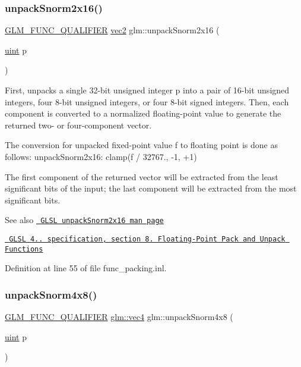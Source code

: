 \subsubsection{\texorpdfstring{unpackSnorm2x16()}{unpackSnorm2x16()}}
{\footnotesize\ttfamily \mbox{\hyperlink{setup_8hpp_a33fdea6f91c5f834105f7415e2a64407}{G\+L\+M\+\_\+\+F\+U\+N\+C\+\_\+\+Q\+U\+A\+L\+I\+F\+I\+ER}} \mbox{\hyperlink{group__core__types_gaa1618f51db67eaa145db101d8c8431d8}{vec2}} glm\+::unpack\+Snorm2x16 (\begin{DoxyParamCaption}\item[{\mbox{\hyperlink{group__core__precision_ga4fd29415871152bfb5abd588334147c8}{uint}}}]{p }\end{DoxyParamCaption})}

First, unpacks a single 32-\/bit unsigned integer p into a pair of 16-\/bit unsigned integers, four 8-\/bit unsigned integers, or four 8-\/bit signed integers. Then, each component is converted to a normalized floating-\/point value to generate the returned two-\/ or four-\/component vector.

The conversion for unpacked fixed-\/point value f to floating point is done as follows\+: unpack\+Snorm2x16\+: clamp(f / 32767., -\/1, +1)

The first component of the returned vector will be extracted from the least significant bits of the input; the last component will be extracted from the most significant bits.

\begin{DoxySeeAlso}{See also}
\href{http://www.opengl.org/sdk/docs/manglsl/xhtml/unpackSnorm2x16.xml}{\texttt{ G\+L\+SL unpack\+Snorm2x16 man page}} 

\href{http://www.opengl.org/registry/doc/GLSLangSpec.4.20.8.pdf}{\texttt{ G\+L\+SL 4.. specification, section 8. Floating-\/\+Point Pack and Unpack Functions}} 
\end{DoxySeeAlso}


Definition at line 55 of file func\+\_\+packing.\+inl.

\mbox{\label{group__core__func__packing_ga4b18a0480e7260401d97f40cacd6bc36}} 
\subsubsection{\texorpdfstring{unpackSnorm4x8()}{unpackSnorm4x8()}}
{\footnotesize\ttfamily \mbox{\hyperlink{setup_8hpp_a33fdea6f91c5f834105f7415e2a64407}{G\+L\+M\+\_\+\+F\+U\+N\+C\+\_\+\+Q\+U\+A\+L\+I\+F\+I\+ER}} \mbox{\hyperlink{group__core__types_ga5881b1b022d7fd1b7218f5916532dd02}{glm\+::vec4}} glm\+::unpack\+Snorm4x8 (\begin{DoxyParamCaption}\item[{\mbox{\hyperlink{group__core__precision_ga4fd29415871152bfb5abd588334147c8}{uint}}}]{p }\end{DoxyParamCaption})}

